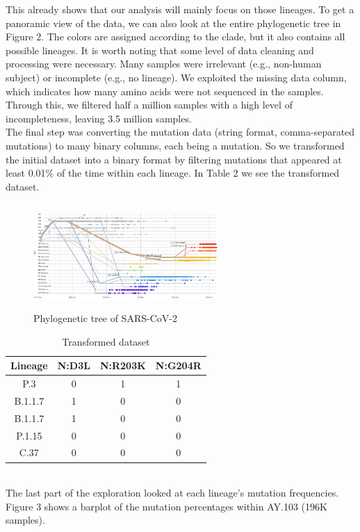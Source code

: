 \documentclass[twoside,twocolumn]{article}
\begin{document}
This already shows that our analysis will mainly focus on those lineages. To get a panoramic view of the data, we can also look at the entire phylogenetic tree in Figure 2. The colors are assigned according to the clade, but it also contains all possible lineages. It is worth noting that some level of data cleaning and processing were necessary. Many samples were irrelevant (e.g., non-human subject) or incomplete (e.g., no lineage). We exploited the missing data column, which indicates how many amino acids were not sequenced in the samples. Through this, we filtered half a million samples with a high level of incompleteness, leaving 3.5 million samples. \\
The final step was converting the mutation data (string format, comma-separated mutations) to many binary columns, each being a mutation. So we transformed the initial dataset into a binary format by filtering mutations that appeared at least 0.01\% of the time within each lineage. In Table 2 we see the transformed dataset.
\begin{figure}[h]
		\caption{Phylogenetic tree of SARS-CoV-2}
	\label{tree}
	\centering
	\includegraphics[width=70mm, height=40mm]{covidtree.png}
\end{figure}
	\begin{table}
	\caption{Transformed dataset}
	\centering
		\renewcommand{\arraystretch}{1.2} %
	\begin{tabular}{| c | c | c | c | }
		\hline
		Lineage & N:D3L & N:R203K & N:G204R\\
		\hline
		P.3& 0 & 1 & 1 \\
		B.1.1.7 & 1 & 0&0 \\
		B.1.1.7 & 1 & 0&0 \\
		P.1.15 & 0 & 0 &0\\
		C.37 & 0 & 0 &0\\
		\hline
	\end{tabular}
\end{table}
\\The last part of the exploration looked at each lineage's mutation frequencies. Figure 3 shows a barplot of the mutation percentages within AY.103 (196K samples).
\end{document}
